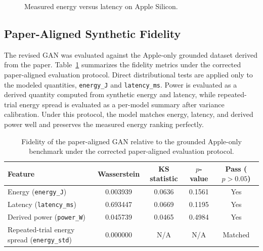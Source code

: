 \documentclass[11pt]{article}
\begin{document}
\begin{figure}[ht]
\centering
{}
\caption{Measured energy versus latency on Apple Silicon.}
\label{fig:energy-vs-latency}
\end{figure}

\subsection{Paper-Aligned Synthetic Fidelity}
The revised GAN was evaluated against the Apple-only grounded dataset derived
from the paper. Table~\ref{tab:fidelity} summarizes the fidelity metrics under
the corrected paper-aligned evaluation protocol. Direct distributional tests are
applied only to the modeled quantities, \texttt{energy\_J} and
\texttt{latency\_ms}. Power is evaluated as a derived quantity computed from
synthetic energy and latency, while repeated-trial energy spread is evaluated as
a per-model summary after variance calibration. Under this protocol, the model
matches energy, latency, and derived power well and preserves the measured
energy ranking perfectly.

\begin{table}[ht]
\centering
\caption{Fidelity of the paper-aligned GAN relative to the grounded Apple-only benchmark under the corrected paper-aligned evaluation protocol.}
\label{tab:fidelity}
\begin{tabular}{l c c c c}
\toprule
Feature & {Wasserstein} & {KS statistic} & {$p$-value} & Pass ($p>0.05$) \\
\midrule
Energy (\texttt{energy\_J}) & 0.003939 & 0.0636 & 0.1561 & Yes \\
Latency (\texttt{latency\_ms}) & 0.693447 & 0.0669 & 0.1195 & Yes \\
Derived power (\texttt{power\_W}) & 0.045739 & 0.0465 & 0.4984 & Yes \\
Repeated-trial energy spread (\texttt{energy\_std}) & 0.000000 & N/A & N/A & Matched \\
\bottomrule
\end{tabular}
\end{table}
\end{document}

